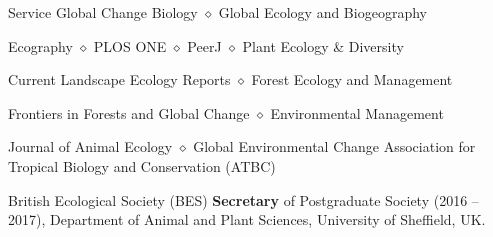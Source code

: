 
\begin{rubric}{Service}
    Global Change Biology $\diamond$ Global Ecology and Biogeography \par  Ecography $\diamond$ PLOS ONE $\diamond$ PeerJ $\diamond$ Plant Ecology \& Diversity \par Current Landscape Ecology Reports $\diamond$ Forest Ecology and Management \par Frontiers in Forests and Global Change $\diamond$ Environmental Management \par Journal of Animal Ecology $\diamond$ Global Environmental Change
	Association for Tropical Biology and Conservation (ATBC) 
	\par British Ecological Society (BES)
    \textbf{Secretary} of Postgraduate Society (2016 -- 2017), Department of Animal and Plant Sciences, University of Sheffield, UK.
\end{rubric}

